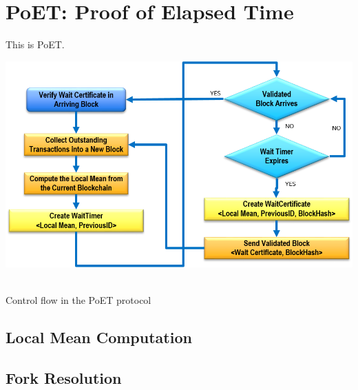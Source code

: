 \section{PoET: Proof of Elapsed Time}
\label{sec_poet}

This is PoET.

\begin{center}
  \includegraphics[scale=.75]{figures/PoET_Flow.png} \
  \caption{Control flow in the PoET protocol}
  \label{fig:poetflow}
\end{center}

\subsection{Local Mean Computation}

\subsection{Fork Resolution}

